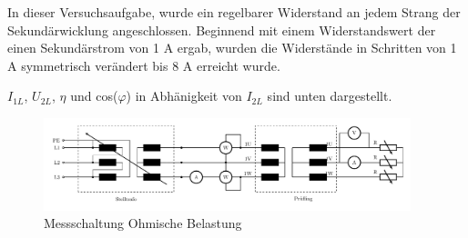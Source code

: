 In dieser Versuchsaufgabe, wurde ein regelbarer Widerstand an jedem Strang der Sekundärwicklung angeschlossen. Beginnend mit einem Widerstandswert der einen Sekundärstrom von 1 A ergab, wurden die Widerstände   in Schritten von 1 A symmetrisch verändert bis 8 A erreicht wurde. \par
$I_{1L}$, $U_{2L}$, $\eta$ und cos($\varphi$) in Abhänigkeit von $I_{2L}$  sind unten dargestellt. 
\begin{figure}[H]
    \centering
    \includegraphics[width=0.95\textwidth]{fig/ohm_mess.pdf}
    \caption{Messschaltung Ohmische Belastung }
    \label{fig:my_label}
\end{figure}
